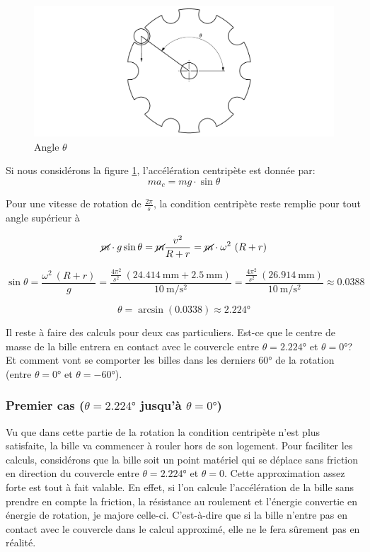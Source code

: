 \begin{figure}
    \centering
    \includegraphics[width=\textwidth]{Graphics/Dessins_justification_Leon/JUST_ANGLE_FAUSSE_COTE.pdf}
    \caption{Angle $\theta$}
    \label{fig:4.1}
\end{figure}

Si nous considérons la figure \ref{fig:4.1}, l'accélération centripète est donnée par:
\[ma_{c} = mg \cdot \sin{\theta}\]

Pour une vitesse de rotation de \(\frac{2 \pi}{s}\), la condition centripète reste remplie pour tout angle supérieur à 

\[\cancel{m} \cdot g \sin{\theta} = \cancel{m} \frac{v^{2}}{R + r} = \cancel{m} \cdot \omega^{2} \ (R +r)\]

\[\sin{\theta} = \frac{\omega^{2} \ (R + r)}{g} = \frac{\frac{4 \pi^{2}}{s^{2}}\ (\SI{24.414}{\milli\metre} + \SI{2.5}{\milli\metre})}{\SI{10}{\m\per\s\squared}} = \frac{\frac{4 \pi^{2}}{s^{2}} \ (\SI{26.914}{\milli\metre})}{\SI{10}{\m\per\s\squared}} \approx 0.0388\]

\[\theta = \arcsin(0.0338) \approx \ang{2.224}\]

Il reste à faire des calculs pour deux cas particuliers. Est-ce que le centre de masse de la bille entrera en contact avec le couvercle entre \(\theta = \ang{2.224}\) et \(\theta = \ang{0}\)? Et comment vont se comporter les billes dans les derniers \ang{60} de la rotation (entre \(\theta = \ang{0}\) et \(\theta = \ang{-60}\)).

\subsubsection{Premier cas ($\theta = \ang{2.224}$ jusqu'à $\theta = \ang{0}$)}

Vu que dans cette partie de la rotation la condition centripète n'est plus satisfaite, la bille va commencer à rouler hors de son logement. Pour faciliter les calculs, considérons que la bille soit un point matériel qui se déplace sans friction en direction du couvercle entre $\theta = \ang{2.224}$ et $\theta = 0$. 
Cette approximation assez forte est tout à fait valable. En effet, si l'on calcule l'accélération de la bille sans prendre en compte la friction, la résistance au roulement et l'énergie convertie en énergie de rotation, je majore celle-ci. C'est-à-dire que si la bille n'entre pas en contact avec le couvercle dans le calcul approximé, elle ne le fera sûrement pas en réalité.\\

